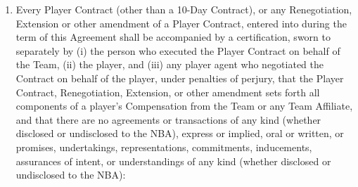 \documentclass[
]{book}
\providecommand{\tightlist}{%
  \setlength{\itemsep}{0pt}\setlength{\parskip}{0pt}}
\begin{document}
\begin{enumerate}
\def\labelenumi{(\alph{enumi})}
\tightlist
\item
  Every Player Contract (other than a 10-Day Contract), or any Renegotiation, Extension or other amendment of a Player Contract, entered into during the term of this Agreement shall be accompanied by a certification, sworn to separately by (i) the person who executed the Player Contract on behalf of the Team, (ii) the player, and (iii) any player agent who negotiated the Contract on behalf of the player, under penalties of perjury, that the Player Contract, Renegotiation, Extension, or other amendment sets forth all components of a player's Compensation from the Team or any Team Affiliate, and that there are no agreements or transactions of any kind (whether disclosed or undisclosed to the NBA), express or implied, oral or written, or promises, undertakings, representations, commitments, inducements, assurances of intent, or understandings of any kind (whether disclosed or undisclosed to the NBA):


\end{enumerate}
\end{document}
